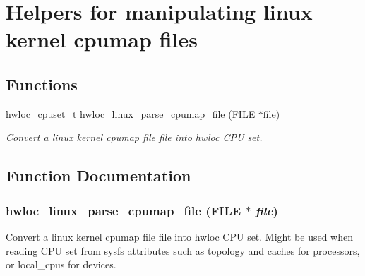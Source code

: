 \hypertarget{group__hwlocality__linux__cpumap}{
\section{Helpers for manipulating linux kernel cpumap files}
\label{group__hwlocality__linux__cpumap}
}
\subsection*{Functions}
\begin{DoxyCompactItemize}
\item 
\hyperlink{group__hwlocality__cpuset_ga7366332f7090f5b54d4b25a0c2c4b411}{hwloc\_\-cpuset\_\-t} \hyperlink{group__hwlocality__linux__cpumap_gaaa0078dd3d869600622243b4e52936b2}{hwloc\_\-linux\_\-parse\_\-cpumap\_\-file} (FILE $\ast$file)
\begin{DoxyCompactList}\small\item\em Convert a linux kernel cpumap file {\ttfamily file} into hwloc CPU set. \item\end{DoxyCompactList}\end{DoxyCompactItemize}


\subsection{Function Documentation}
\hypertarget{group__hwlocality__linux__cpumap_gaaa0078dd3d869600622243b4e52936b2}{
\subsubsection[{hwloc\_\-linux\_\-parse\_\-cpumap\_\-file}]{ hwloc\_\-linux\_\-parse\_\-cpumap\_\-file (FILE $\ast$ {\em file})}}
\label{group__hwlocality__linux__cpumap_gaaa0078dd3d869600622243b4e52936b2}


Convert a linux kernel cpumap file {\ttfamily file} into hwloc CPU set. Might be used when reading CPU set from sysfs attributes such as topology and caches for processors, or local\_\-cpus for devices. 
